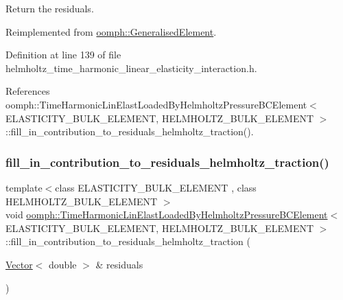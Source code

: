 Return the residuals. 



Reimplemented from \hyperlink{classoomph_1_1GeneralisedElement_a310c97f515e8504a48179c0e72c550d7}{oomph\+::\+Generalised\+Element}.



Definition at line 139 of file helmholtz\+\_\+time\+\_\+harmonic\+\_\+linear\+\_\+elasticity\+\_\+interaction.\+h.



References oomph\+::\+Time\+Harmonic\+Lin\+Elast\+Loaded\+By\+Helmholtz\+Pressure\+B\+C\+Element$<$ E\+L\+A\+S\+T\+I\+C\+I\+T\+Y\+\_\+\+B\+U\+L\+K\+\_\+\+E\+L\+E\+M\+E\+N\+T, H\+E\+L\+M\+H\+O\+L\+T\+Z\+\_\+\+B\+U\+L\+K\+\_\+\+E\+L\+E\+M\+E\+N\+T $>$\+::fill\+\_\+in\+\_\+contribution\+\_\+to\+\_\+residuals\+\_\+helmholtz\+\_\+traction().

\mbox{\label{classoomph_1_1TimeHarmonicLinElastLoadedByHelmholtzPressureBCElement_a42333cd2a19c901bc01d666d85a4e108}} 
\subsubsection{\texorpdfstring{fill\+\_\+in\+\_\+contribution\+\_\+to\+\_\+residuals\+\_\+helmholtz\+\_\+traction()}{fill\_in\_contribution\_to\_residuals\_helmholtz\_traction()}}
{\footnotesize\ttfamily template$<$class E\+L\+A\+S\+T\+I\+C\+I\+T\+Y\+\_\+\+B\+U\+L\+K\+\_\+\+E\+L\+E\+M\+E\+NT , class H\+E\+L\+M\+H\+O\+L\+T\+Z\+\_\+\+B\+U\+L\+K\+\_\+\+E\+L\+E\+M\+E\+NT $>$ \\
void \hyperlink{classoomph_1_1TimeHarmonicLinElastLoadedByHelmholtzPressureBCElement}{oomph\+::\+Time\+Harmonic\+Lin\+Elast\+Loaded\+By\+Helmholtz\+Pressure\+B\+C\+Element}$<$ E\+L\+A\+S\+T\+I\+C\+I\+T\+Y\+\_\+\+B\+U\+L\+K\+\_\+\+E\+L\+E\+M\+E\+NT, H\+E\+L\+M\+H\+O\+L\+T\+Z\+\_\+\+B\+U\+L\+K\+\_\+\+E\+L\+E\+M\+E\+NT $>$\+::fill\+\_\+in\+\_\+contribution\+\_\+to\+\_\+residuals\+\_\+helmholtz\+\_\+traction (\begin{DoxyParamCaption}\item[{\hyperlink{classoomph_1_1Vector}{Vector}$<$ double $>$ \&}]{residuals }\end{DoxyParamCaption})\hspace{0.3cm}{\ttfamily [protected]}}



